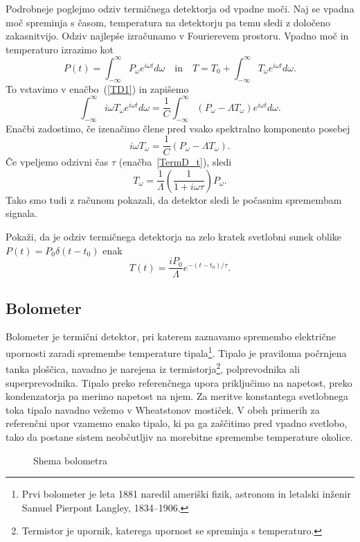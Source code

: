 Podrobneje poglejmo odziv termičnega detektorja od vpadne moči. Naj se vpadna moč
spreminja s časom, temperatura na detektorju pa temu sledi z določeno zakasnitvijo. Odziv
najlepše izračunamo v Fourierevem prostoru. Vpadno moč in temperaturo izrazimo kot
\begin{equation}
P(t) = \int_{-\infty}^{\infty} P_\omega e^{i\omega t}d\omega \quad \mathrm{in} \quad
T = T_0 + \int_{-\infty}^{\infty} T_\omega e^{i\omega t}d\omega.
\label{TermTF}
\end{equation}
To vstavimo v enačbo~(\ref{TD1}) in zapišemo
\begin{equation}
\int_{-\infty}^{\infty} i \omega T_\omega e^{i\omega t}d\omega = \frac{1}{C}
\int_{-\infty}^{\infty} (P_\omega - \Lambda T_\omega) e^{i\omega t}d\omega.
\end{equation}
Enačbi zadostimo, če izenačimo člene pred vsako spektralno komponento posebej
\begin{equation}
i \omega T_\omega = \frac{1}{C}\left(P_\omega - \Lambda T_\omega\right).
\end{equation}
Če vpeljemo odzivni čas $\tau$ (enačba~\ref{TermD_t}), sledi
\begin{equation}
T_\omega = \frac{1}{\Lambda}\left(\frac{1}{1+i \omega \tau}\right)P_\omega.
\label{TermOdziv}
\end{equation}
Tako smo tudi z računom pokazali, da detektor sledi le počasnim spremembam signala. 
\begin{definition}
Pokaži, da je odziv termičnega detektorja na zelo kratek svetlobni sunek oblike 
$P(t) = P_0 \delta(t-t_0)$ enak 
\begin{equation}
T(t)=\frac{iP_0}{\Lambda}e^{-(t-t_0)/\tau}.
\end{equation}
\end{definition}

\subsection*{Bolometer}
Bolometer je termični detektor, pri katerem zaznavamo spremembo 
električne upornosti
zaradi spremembe temperature tipala\footnote{Prvi bolometer je leta 1881 naredil
ameriški fizik, astronom in letalski inženir Samuel Pierpont Langley, 1834--1906.}. 
Tipalo je praviloma počrnjena tanka ploščica, 
navadno je narejena iz termistorja\footnote{Termistor je upornik, katerega
upornost se spreminja s temperaturo.}, 
polprevodnika ali superprevodnika. Tipalo preko
referenčnega upora priključimo na napetost, preko kondenzatorja pa merimo napetost na njem.
Za meritve konstantega svetlobnega toka tipalo navadno vežemo v Wheatstonov mostiček. V obeh
primerih za referenčni upor vzamemo enako tipalo, ki pa ga zaščitimo pred vpadno svetlobo, 
tako da postane sistem neobčutljiv na morebitne spremembe temperature okolice.
\begin{figure}[h!]
\centering
\def\svgwidth{75truemm} 

\caption{Shema bolometra}
\label{fig:Bolometer-shema}
\end{figure}

